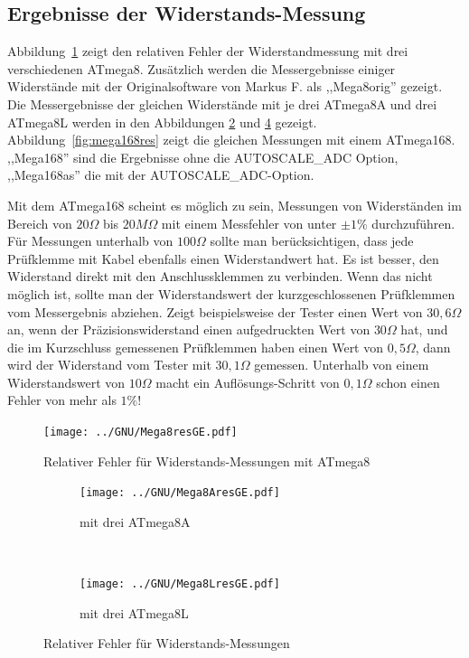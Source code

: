 \subsection{Ergebnisse der Widerstands-Messung}
Abbildung~\ref{fig:mega8res} zeigt den relativen Fehler der Widerstandmessung mit drei verschiedenen ATmega8. 
Zusätzlich werden die Messergebnisse einiger Widerstände mit der Originalsoftware von Markus F. als
,,Mega8orig'' gezeigt.
Die Messergebnisse der gleichen Widerstände mit je drei ATmega8A und drei ATmega8L werden in den Abbildungen
\ref{fig:mega8Ares} und \ref{fig:mega8Lres} gezeigt.
Abbildung~\ref{fig:mega168res} zeigt die gleichen Messungen mit einem ATmega168.
,,Mega168'' sind die Ergebnisse ohne die AUTOSCALE\_ADC Option, ,,Mega168as'' die mit der
 AUTOSCALE\_ADC-Option.

Mit dem ATmega168 scheint es möglich zu sein, Messungen von Widerständen im
Bereich von \(20\Omega\) bis \(20M\Omega\) mit einem Messfehler von unter \(\pm1\%\) durchzuführen.
Für Messungen unterhalb von \(100\Omega\) sollte man berücksichtigen, dass jede Prüfklemme mit Kabel ebenfalls
einen Widerstandwert hat.
Es ist besser, den Widerstand direkt mit den Anschlussklemmen zu verbinden.
Wenn das nicht möglich ist, sollte man der Widerstandswert der kurzgeschlossenen Prüfklemmen vom Messergebnis abziehen.
Zeigt beispielsweise der Tester einen Wert von \(30,6\Omega\) an, wenn der Präzisionswiderstand einen aufgedruckten Wert von \(30\Omega\) hat, 
und die im Kurzschluss gemessenen Prüfklemmen haben einen Wert von \(0,5\Omega\), dann wird der Widerstand vom
Tester mit \(30,1\Omega\) gemessen.
Unterhalb von einem Widerstandswert von \(10\Omega\) macht ein Auflösungs-Schritt von \(0,1\Omega\) schon einen Fehler von mehr als \(1\%\)!

\begin{figure}[H]
\centering
\texttt{[image: ../GNU/Mega8resGE.pdf]}
\caption{Relativer Fehler für Widerstands-Messungen mit ATmega8 }
\label{fig:mega8res}
\end{figure}

\begin{figure}[H]
  \begin{subfigure}[b]{.5\textwidth}
    \centering
    \texttt{[image: ../GNU/Mega8AresGE.pdf]}
    \caption{mit drei ATmega8A}
    \label{fig:mega8Ares}
  \end{subfigure}
  ~
  \begin{subfigure}[b]{.5\textwidth}
    \centering
    \texttt{[image: ../GNU/Mega8LresGE.pdf]}
    \caption{mit drei ATmega8L}
    \label{fig:mega8Lres}
  \end{subfigure}
\caption{Relativer Fehler für Widerstands-Messungen}
\end{figure}

